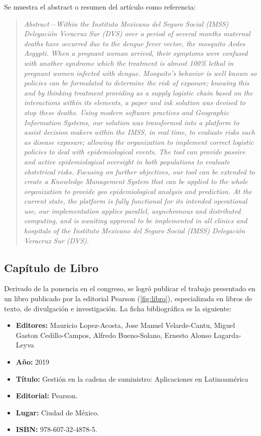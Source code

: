 Se muestra el abstract o resumen del artículo como referencia:

\begin{quote}
\emph{Abstract—Within the Instituto Mexicano del Seguro Social (IMSS) Delegación
    Veracruz Sur (DVS) over a period of several months maternal deaths have
    occurred due to the dengue fever vector, the mosquito Aedes Aegypti. When a
    pregnant woman arrived, their symptoms were confused with another syndrome
    which the treatment is almost 100\% lethal in pregnant women infected with
    dengue. Mosquito’s behavior is well known so policies can be formulated to
    determine the risk of exposure; knowing this and by thinking treatment
    providing as a supply logistic chain based on the interactions within its
    elements, a paper and ink solution was devised to stop these deaths. Using
    modern software practices and Geographic Information Systems, our solution
    was transformed into a platform to assist decision makers within the IMSS,
    in real time, to evaluate risks such as disease exposure; allowing the
    organization to implement correct logistic policies to deal with
    epidemiological events. The tool can provide passive and active
    epidemiological oversight in both populations to evaluate obstetrical risks.
    Focusing on further objectives, our tool can be extended to create a
    Knowledge Management System that can be applied to the whole organization to
    provide geo epidemiological analysis and prediction. At the current state,
    the platform is fully functional for its intended operational use, our
    implementation applies parallel, asynchronous and distributed computing, and
    is awaiting approval to be implemented in all clinics and hospitals of the
    Instituto Mexicano del Seguro Social (IMSS) Delegación Veracruz Sur (DVS).}
\end{quote}

\subsection{Capítulo de Libro}

Derivado de la ponencia en el congreso, se logró publicar el trabajo presentado
en un libro publicado por la editorial Pearson (\autoref{fig:libro}),
especializada en libros de texto, de divulgación e investigación. La ficha
bibliográfica es la siguiente:

\begin{itemize}
    \item{\textbf{Editores: }} Mauricio Lopez-Acosta,  Jose Manuel
    Velarde-Cantu, Miguel Gaston Cedillo-Campos, Alfredo Bueno-Solano, Ernesto
    Alonso Lagarda-Leyva
    \item{\textbf{Año: }} 2019
    \item{\textbf{Título: }} Gestión en la cadena de suministro: Aplicaciones en
    Latinoamérica
    \item{\textbf{Editorial: }} Pearson.
    \item{\textbf{Lugar: }} Ciudad de México.
    \item{\textbf{ISBN: }} 978-607-32-4878-5.
\end{itemize}

